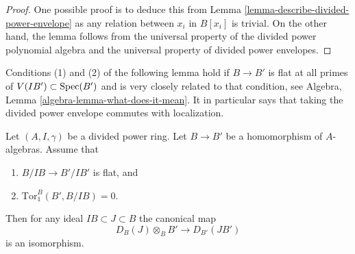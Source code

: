 \begin{proof}
One possible proof is to deduce this from
Lemma \ref{lemma-describe-divided-power-envelope}
as any relation between $x_i$ in $B[x_i]$ is trivial.
On the other hand, the lemma follows from the universal property
of the divided power polynomial algebra and the universal property of
divided power envelopes.
\end{proof}

\noindent
Conditions (1) and (2) of the following lemma hold if $B \to B'$ is flat
at all primes of $V(IB') \subset \mathop{\mathrm{Spec}}(B')$ and is very closely related
to that condition, see
Algebra, Lemma \ref{algebra-lemma-what-does-it-mean}.
It in particular says that taking the divided power
envelope commutes with localization.

\begin{lemma}
\label{lemma-flat-base-change-divided-power-envelope}
Let $(A, I, \gamma)$ be a divided power ring.
Let $B \to B'$ be a homomorphism of $A$-algebras.
Assume that
\begin{enumerate}
\item $B/IB \to B'/IB'$ is flat, and
\item $\text{Tor}_1^B(B', B/IB) = 0$.
\end{enumerate}
Then for any ideal $IB \subset J \subset B$ the canonical map
$$
D_B(J) \otimes_B B' \longrightarrow D_{B'}(JB')
$$
is an isomorphism.
\end{lemma}

